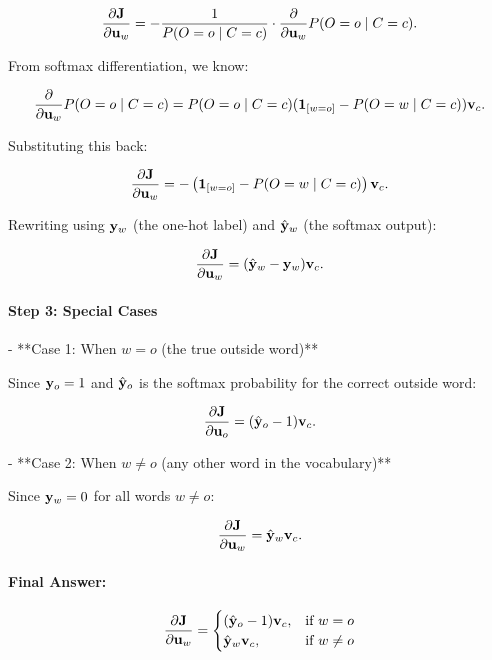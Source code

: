 \begin{parts}
{\[
\frac{\partial \mathbf{J}}{\partial \mathbf{u}_w} = - \frac{1}{P(O = o \mid C = c)} \cdot \frac{\partial}{\partial \mathbf{u}_w} P(O = o \mid C = c).
\]

From softmax differentiation, we know:

\[
\frac{\partial}{\partial \mathbf{u}_w} P(O = o \mid C = c) =
P(O = o \mid C = c) ( \mathbf{1}_{[w = o]} - P(O = w \mid C = c) ) \mathbf{v}_c.
\]

Substituting this back:

\[
\frac{\partial \mathbf{J}}{\partial \mathbf{u}_w} = - \left( \mathbf{1}_{[w = o]} - P(O = w \mid C = c) \right) \mathbf{v}_c.
\]

Rewriting using $\mathbf{y}_w$ (the one-hot label) and $\hat{\mathbf{y}}_w$ (the softmax output):

\[
\frac{\partial \mathbf{J}}{\partial \mathbf{u}_w} = (\hat{\mathbf{y}}_w - \mathbf{y}_w) \mathbf{v}_c.
\]

\paragraph{Step 3: Special Cases}

- **Case 1: When $w = o$ (the true outside word)**

  Since $\mathbf{y}_o = 1$ and $\hat{\mathbf{y}}_o$ is the softmax probability for the correct outside word:

  \[
  \frac{\partial \mathbf{J}}{\partial \mathbf{u}_o} = (\hat{\mathbf{y}}_o - 1) \mathbf{v}_c.
  \]

- **Case 2: When $w \neq o$ (any other word in the vocabulary)**

  Since $\mathbf{y}_w = 0$ for all words $w \neq o$:

  \[
  \frac{\partial \mathbf{J}}{\partial \mathbf{u}_w} = \hat{\mathbf{y}}_w \mathbf{v}_c.
  \]

\paragraph{Final Answer:}
\[
\frac{\partial \mathbf{J}}{\partial \mathbf{u}_w} =
\begin{cases}
(\hat{\mathbf{y}}_o - 1) \mathbf{v}_c, & \text{if } w = o \\
\hat{\mathbf{y}}_w \mathbf{v}_c, & \text{if } w \neq o
\end{cases}
\]

}

\end{parts}
